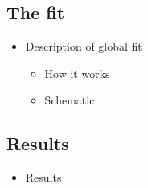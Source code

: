 \subsection{The fit}
\begin{itemize}
    \item Description of global fit
    \begin{itemize}
        \item How it works
        \item Schematic
    \end{itemize}
\end{itemize}

\subsection{Results}
\begin{itemize}
    \item Results 
\end{itemize}



\clearpage
